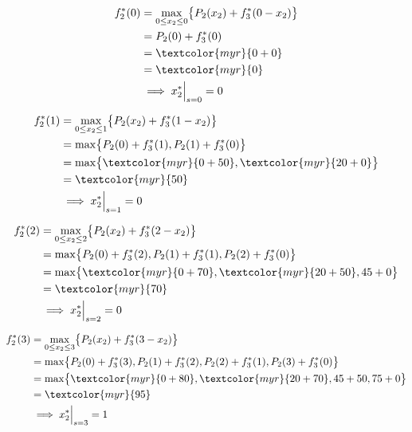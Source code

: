 \documentclass{report}
\begin{document}
\begin{align*}
    f_2^{*}(0) &= \max_{0 \leq x_2 \leq 0} \bigl\{ P_2(x_2) + f_3^{*}(0 - x_2) \bigr\} \\
               &= P_2(0) + f_3^{*}(0) \\
               &= \textcolor{myr}{0 + 0} \\
               &= \textcolor{myr}{0} \\
               &\implies x_2^{*}\Big|_{s = 0} = 0
\end{align*}

\begin{align*}
    f_2^{*}(1) &= \max_{0 \leq x_2 \leq 1} \bigl\{ P_2(x_2) + f_3^{*}(1 - x_2) \bigr\} \\
               &= \max \bigl\{ P_2(0) + f_3^{*}(1), P_2(1) + f_3^{*}(0) \bigr\} \\
               &= \max \bigl\{ \textcolor{myr}{0 + 50}, \textcolor{myr}{20 + 0} \bigr\} \\
               &= \textcolor{myr}{50} \\
               &\implies x_2^{*}\Big|_{s = 1} = 0
\end{align*}

\begin{align*}
    f_2^{*}(2) &= \max_{0 \leq x_2 \leq 2} \bigl\{ P_2(x_2) + f_3^{*}(2 - x_2) \bigr\} \\
               &= \max \bigl\{ P_2(0) + f_3^{*}(2), P_2(1) + f_3^{*}(1), P_2(2) + f_3^{*}(0) \bigr\} \\
               &= \max \bigl\{ \textcolor{myr}{0 + 70}, \textcolor{myr}{20 + 50}, 45 + 0 \bigr\} \\
               &= \textcolor{myr}{70} \\
               &\implies x_2^{*}\Big|_{s = 2} = 0
\end{align*}

\begin{align*}
    f_2^{*}(3) &= \max_{0 \leq x_2 \leq 3} \bigl\{ P_2(x_2) + f_3^{*}(3 - x_2) \bigr\} \\
               &= \max \bigl\{ P_2(0) + f_3^{*}(3), P_2(1) + f_3^{*}(2), P_2(2) + f_3^{*}(1), P_2(3) + f_3^{*}(0) \bigr\} \\
               &= \max \bigl\{ \textcolor{myr}{0 + 80}, \textcolor{myr}{20 + 70}, 45 + 50, 75 + 0 \bigr\} \\
               &= \textcolor{myr}{95} \\
               &\implies x_2^{*}\Big|_{s = 3} = 1
\end{align*}
\end{document}
